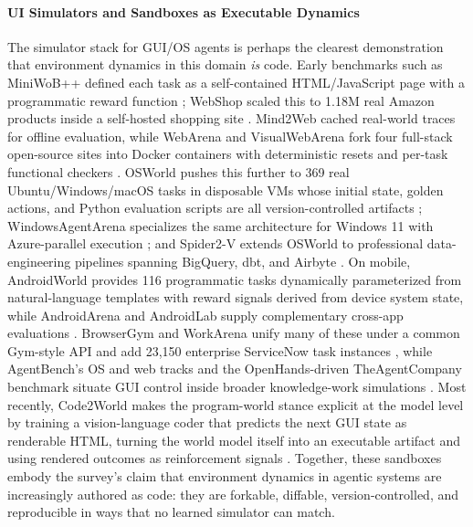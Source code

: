 \documentclass{llmxive}
\begin{document}
\paragraph{UI Simulators and Sandboxes as Executable Dynamics}

The simulator stack for GUI/OS agents is perhaps the clearest demonstration that environment dynamics in this domain \textit{is} code. Early benchmarks such as MiniWoB++ defined each task as a self-contained HTML/JavaScript page with a programmatic reward function \citep{liu2018reinforcementlearningwebinterfaces}; WebShop scaled this to 1.18M real Amazon products inside a self-hosted shopping site \citep{yao2023webshopscalablerealworldweb}. Mind2Web cached real-world traces for offline evaluation, while WebArena and VisualWebArena fork four full-stack open-source sites into Docker containers with deterministic resets and per-task functional checkers \citep{deng2023mind2webgeneralistagentweb,zhou2024webarenarealisticwebenvironment,koh2024visualwebarenaevaluatingmultimodalagents}. OSWorld pushes this further to 369 real Ubuntu/Windows/macOS tasks in disposable VMs whose initial state, golden actions, and Python evaluation scripts are all version-controlled artifacts \citep{xie2024osworldbenchmarkingmultimodalagents}; WindowsAgentArena specializes the same architecture for Windows 11 with Azure-parallel execution \citep{bonatti2024windowsagentarenaevaluating}; and Spider2-V extends OSWorld to professional data-engineering pipelines spanning BigQuery, dbt, and Airbyte \citep{cao2024spider2vfarmultimodalagents}. On mobile, AndroidWorld provides 116 programmatic tasks dynamically parameterized from natural-language templates with reward signals derived from device system state, while AndroidArena and AndroidLab supply complementary cross-app evaluations \citep{rawles2025androidworlddynamicbenchmarkingenvironment,xing2024understandingweaknesslargelanguage,xu2024androidlabtrainingsystematicbenchmarking}. BrowserGym and WorkArena unify many of these under a common Gym-style API and add 23,150 enterprise ServiceNow task instances \citep{drouin2024workarenacapablewebagents}, while AgentBench's OS and web tracks and the OpenHands-driven TheAgentCompany benchmark situate GUI control inside broader knowledge-work simulations \citep{liu2025agentbenchevaluatingllmsagents,xu2025theagentcompanybenchmarkingllmagents}. Most recently, Code2World makes the program-world stance explicit at the model level by training a vision-language coder that predicts the next GUI state as renderable HTML, turning the world model itself into an executable artifact and using rendered outcomes as reinforcement signals \citep{zheng2026code2worldguiworldmodel}. Together, these sandboxes embody the survey's claim that environment dynamics in agentic systems are increasingly authored as code: they are forkable, diffable, version-controlled, and reproducible in ways that no learned simulator can match.
\end{document}
